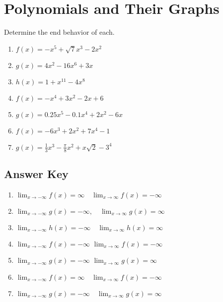 \chapter{Polynomials and Their Graphs}
\everymath{\displaystyle}

Determine the end behavior of each.
\begin{enumerate}
\item $f(x) = -x^5 + \sqrt{7}x^3 - 2x^2$
\item $g(x) = 4x^2 - 16x^6 + 3x$
\item $h(x) = 1 + x^{11} - 4x^8$
\item $f(x) = -x^4+3x^2-2x+6$
\item $g(x) = 0.25x^5-0.1x^4+2x^2-6x$
\item $f(x) = -6x^3 + 2x^2 + 7x^4 - 1$
\item $g(x) = \frac{1}{3}x^3 - \frac{\pi}{8}x^2 + x\sqrt{2} - 3^4$
\end{enumerate}

\newpage

\section{Answer Key}

\begin{enumerate}
	\item $\lim_{x \to -\infty} f(x) = \infty \quad \lim_{x \to \infty}f(x) = -\infty$
	\item $\lim_{x \to -\infty} g(x) = -\infty, \quad \lim_{x \to \infty}g(x) = \infty$
	\item $\lim_{x \to -\infty} h(x) = -\infty \quad \lim_{x \to \infty}h(x) =\infty$
	\item $\lim_{x \to -\infty}f(x) = -\infty$ \quad $\lim_{x \to \infty}f(x) = -\infty$
    \item $\lim_{x \to -\infty}g(x) = -\infty$ \quad $\lim_{x \to \infty}g(x) = \infty$
    \item $\lim_{x \to -\infty} f(x) = \infty \quad \lim_{x \to \infty} f(x) = - \infty$
    \item $\lim_{x \to -\infty} g(x) = -\infty \quad \lim_{x \to \infty} g(x) = \infty$
\end{enumerate}